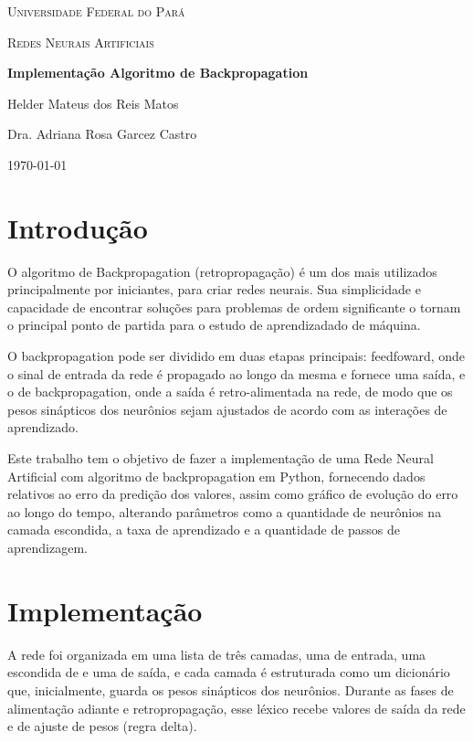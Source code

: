\documentclass[12pt,a4paper]{article}
\begin{document}
\begin{titlepage}
	\centering
	{\scshape\LARGE Universidade Federal do Pará \par}
	\vspace{1cm}
	{\scshape\Large Redes Neurais Artificiais\par}
	\vspace{1.5cm}
	{\huge\bfseries Implementação Algoritmo de Backpropagation\par}
	\vspace{2cm}
	{\Large Helder Mateus dos Reis Matos\par}
	\vfill
	Dra. Adriana Rosa Garcez Castro
	\vfill
	{\large \today\par}
\end{titlepage}

\tableofcontents
\newpage
\section{Introdução}
\qquad O algoritmo de Backpropagation (retropropagação) é um dos mais utilizados principalmente por iniciantes, para criar redes neurais. Sua simplicidade e capacidade de encontrar soluções para problemas de ordem significante o tornam o principal ponto de partida para o estudo de aprendizadado de máquina.
	
\qquad O backpropagation pode ser dividido em duas etapas principais: feedfoward, onde o sinal de entrada da rede é propagado ao longo da mesma e fornece uma saída, e o de backpropagation, onde a saída é retro-alimentada na rede, de modo que os pesos sinápticos dos neurônios sejam ajustados de acordo com as interações de aprendizado.
	
\qquad Este trabalho tem o objetivo de fazer a implementação de uma Rede Neural Artificial com algoritmo de backpropagation em Python, fornecendo dados relativos ao erro da predição dos valores, assim como gráfico de evolução do erro ao longo do tempo, alterando parâmetros como a quantidade de neurônios na camada escondida, a taxa de aprendizado e a quantidade de passos de aprendizagem.

\section{Implementação}
\qquad A rede foi organizada em uma lista de três camadas, uma de entrada, uma escondida de e uma de saída, e cada camada é estruturada como um dicionário que, inicialmente, guarda os pesos sinápticos dos neurônios. Durante as fases de alimentação adiante e retropropagação, esse léxico recebe valores de saída da rede e de ajuste de pesos (regra delta).
\end{document}
